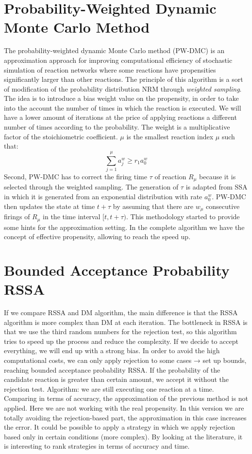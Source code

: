\section{\texorpdfstring{\textbf{Probability-Weighted Dynamic Monte Carlo Method}}{Probability-Weighted Dynamic Monte Carlo Method}}
The probability-weighted dynamic Monte Carlo method (PW-DMC) is an approximation approach for improving computational efficiency of stochastic simulation of reaction networks where some reactions have propensities significantly larger than other reactions.
The principle of this algorithm is a sort of modification of the probability distribution NRM through \emph{weighted sampling}.
The idea is to introduce a bias weight value on the propensity, in order to take into the account the number of times in which the reaction is executed.
We will have a lower amount of iterations at the price of applying reactions a different number of times according to the probability.
The weight is a multiplicative factor of the stoichiometric coefficient.
$\mu$ is the smallest reaction index $\mu$ such that: $$ \sum^{\mu}_{j=1}a^w_j \geq r_1 a^w_0 $$ Second, PW-DMC has to correct the firing time $\tau$ of reaction $R_\mu$ because it is selected through the weighted sampling.
The generation of $\tau$ is adapted from SSA in which it is generated from an exponential distribution with rate $a^w_0$.
PW-DMC then updates the state at time $t + \tau$ by assuming that there are $w_\mu$ consecutive firings of $R_\mu$ in the time interval $[t,t + \tau)$.
This methodology started to provide some hints for the approximation setting.
In the complete algorithm we have the concept of effective propensity, allowing to reach the speed up.

\section{Bounded Acceptance Probability RSSA}
If we compare RSSA and DM algorithm, the main difference is that the RSSA algorithm is more complex than DM at each iteration.
The bottleneck in RSSA is that we use the third random numbers for the rejection test, so this algorithm tries to speed up the process and reduce the complexity.
If we decide to accept everything, we will end up with a strong bias.
In order to avoid the high computational costs, we can only apply rejection to some cases → set up bounds, reaching bounded acceptance probability RSSA.
If the probability of the candidate reaction is greater than certain amount, we accept it without the rejection test.
Algorithm: we are still executing one reaction at a time.
Comparing in terms of accuracy, the approximation of the previous method is not applied.
Here we are not working with the real propensity.
In this version we are totally avoiding the rejection-based part, the approximation in this case increases the error.
It could be possible to apply a strategy in which we apply rejection based only in certain conditions (more complex).
By looking at the literature, it is interesting to rank strategies in terms of accuracy and time.

